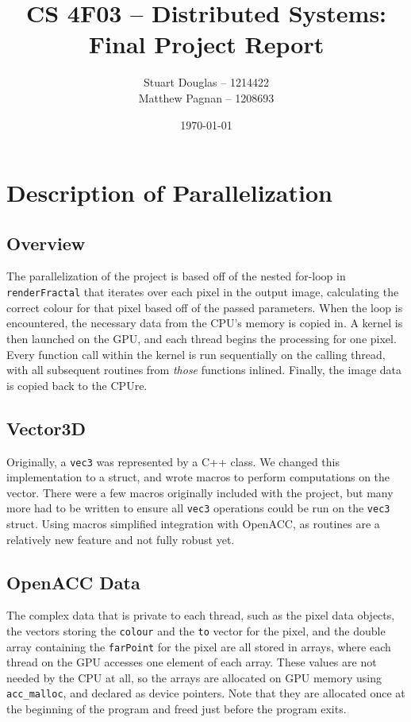 \documentclass[11pt]{article}
\title{
\LARGE CS 4F03 -- Distributed Systems:
\\\vspace{10mm}
\large \textbf{Final Project Report}
\vspace{40mm}
}
\author{
Stuart Douglas -- 1214422
\\Matthew Pagnan -- 1208693
\vspace{10mm}
}
\date{\vfill \today}
\begin{document}
\maketitle
\newpage
\tableofcontents
\newpage

\section{Description of Parallelization}
\subsection{Overview}
The parallelization of the project is based off of the nested for-loop in \texttt{renderFractal} that iterates over each pixel in the output image, calculating the correct colour for that pixel based off of the passed parameters. When the loop is encountered, the necessary data from the CPU's memory is copied in. A kernel is then launched on the GPU, and each thread begins the processing for one pixel. Every function call within the kernel is run sequentially on the calling thread, with all subsequent routines from \emph{those} functions inlined. Finally, the image data is copied back to the CPUre.

\subsection{Vector3D}
Originally, a \texttt{vec3} was represented by a C++ class. We changed this implementation to a struct, and wrote macros to perform computations on the vector. There were a few macros originally included with the project, but many more had to be written to ensure all \texttt{vec3} operations could be run on the \texttt{vec3} struct. Using macros simplified integration with OpenACC, as routines are a relatively new feature and not fully robust yet.

\subsection{OpenACC Data}
The complex data that is private to each thread, such as the pixel data objects, the vectors storing the \texttt{colour} and the \texttt{to} vector for the pixel, and the double array containing the \texttt{farPoint} for the pixel are all stored in arrays, where each thread on the GPU accesses one element of each array. These values are not needed by the CPU at all, so the arrays are allocated on GPU memory using \texttt{acc\_malloc}, and declared as device pointers. Note that they are allocated once at the beginning of the program and freed just before the program exits.
\end{document}
